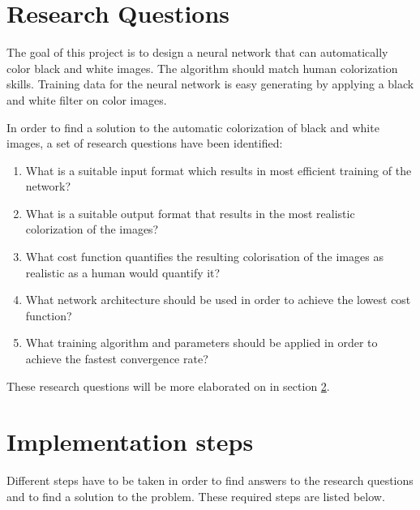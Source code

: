 \section{Research Questions}

The goal of this project is to design a neural network that can automatically color black and white images. The algorithm should match human colorization skills. Training data for the neural network is easy generating by applying a black and white filter on color images. 

In order to find a solution to the automatic colorization of black and white images, a set of research questions have been identified:

\begin{enumerate}
	\item {What is a suitable input format which results in most efficient training of the network?}
	\item {What is a suitable output format that results in the most realistic colorization of the images?}
	\item {What cost function quantifies the resulting colorisation of the images as realistic as a human would quantify it?}
	\item {What network architecture should be used in order to achieve the lowest cost function?}
	\item {What training algorithm and parameters should be applied in order to achieve the fastest convergence rate?}
\end{enumerate}

These research questions will be more elaborated on in section \ref{sec:imsteps}.

\section{Implementation steps}
\label{sec:imsteps}
	
Different steps have to be taken in order to find answers to the research questions and to find a solution to the problem. These required steps are listed below.

